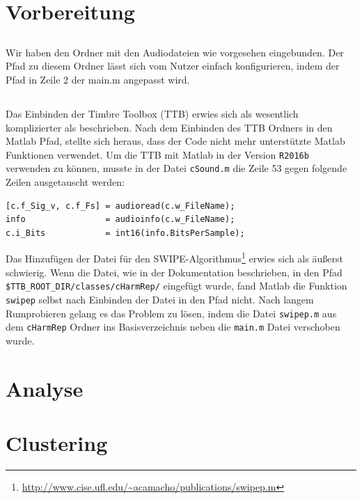 \section{Vorbereitung}
\label{sec:preperation}

\subsection{}
Wir haben den Ordner mit den Audiodateien wie vorgesehen eingebunden.
Der Pfad zu diesem Ordner lässt sich vom Nutzer einfach konfigurieren, indem der Pfad in Zeile 2 der main.m angepasst wird.

\subsection{}
Das Einbinden der Timbre Toolbox (TTB) erwies sich als wesentlich komplizierter als beschrieben.
Nach dem Einbinden des TTB Ordners in den Matlab Pfad, stellte sich heraus, dass der Code nicht mehr unterstützte Matlab Funktionen verwendet.
Um die TTB mit Matlab in der Version \texttt{R2016b} verwenden zu können, musste in der Datei \texttt{cSound.m} die Zeile 53 gegen folgende Zeilen ausgetauscht werden:

\begin{lstlisting}
[c.f_Sig_v, c.f_Fs] = audioread(c.w_FileName);
info                = audioinfo(c.w_FileName);
c.i_Bits            = int16(info.BitsPerSample);
\end{lstlisting}

Das Hinzufügen der Datei für den SWIPE-Algorithmus\footnote{\url{http://www.cise.ufl.edu/~acamacho/publications/swipep.m}} erwies sich als äußerst schwierig.
Wenn die Datei, wie in der Dokumentation beschrieben, in den Pfad \texttt{\$TTB\_ROOT\_DIR/classes/cHarmRep/} eingefügt wurde, fand Matlab die Funktion \texttt{swipep} selbst nach Einbinden der Datei in den Pfad nicht.
Nach langem Rumprobieren gelang es das Problem zu lösen, indem die Datei \texttt{swipep.m} aus dem \texttt{cHarmRep} Ordner ins Basisverzeichnis neben die \texttt{main.m} Datei verschoben wurde.

\section{Analyse}
\label{sec:analyse}




\section{Clustering}
\label{sec:cluster}

